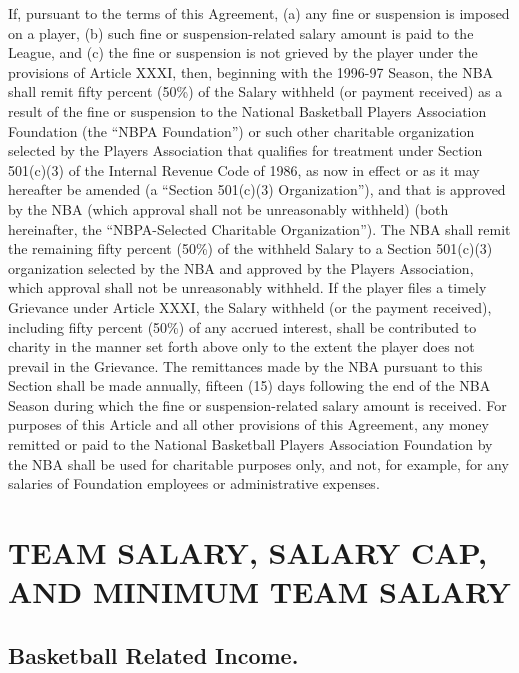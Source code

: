 \documentclass[
]{book}
\begin{document}
If, pursuant to the terms of this Agreement, (a) any fine or suspension is imposed on a player, (b) such fine or suspension-related salary amount is paid to the League, and (c) the fine or suspension is not grieved by the player under the provisions of Article XXXI, then, beginning with the 1996-97 Season, the NBA shall remit fifty percent (50\%) of the Salary withheld (or payment received) as a result of the fine or suspension to the National Basketball Players Association Foundation (the ``NBPA Foundation'') or such other charitable organization selected by the Players Association that qualifies for treatment under Section 501(c)(3) of the Internal Revenue Code of 1986, as now in effect or as it may hereafter be amended (a ``Section 501(c)(3) Organization''), and that is approved by the NBA (which approval shall not be unreasonably withheld) (both hereinafter, the ``NBPA-Selected Charitable Organization''). The NBA shall remit the remaining fifty percent (50\%) of the withheld Salary to a Section 501(c)(3) organization selected by the NBA and approved by the Players Association, which approval shall not be unreasonably withheld. If the player files a timely Grievance under Article XXXI, the Salary withheld (or the payment received), including fifty percent (50\%) of any accrued interest, shall be contributed to charity in the manner set forth above only to the extent the player does not prevail in the Grievance. The remittances made by the NBA pursuant to this Section shall be made annually, fifteen (15) days following the end of the NBA Season during which the fine or suspension-related salary amount is received. For purposes of this Article and all other provisions of this Agreement, any money remitted or paid to the National Basketball Players Association Foundation by the NBA shall be used for charitable purposes only, and not, for example, for any salaries of Foundation employees or administrative expenses.

\hypertarget{team-salary-salary-cap-and-minimum-team-salary}{%
\chapter{TEAM SALARY, SALARY CAP, AND MINIMUM TEAM SALARY}\label{team-salary-salary-cap-and-minimum-team-salary}}


\hypertarget{basketball-related-income.}{%
\section{Basketball Related Income.}\label{basketball-related-income.}}
\end{document}
